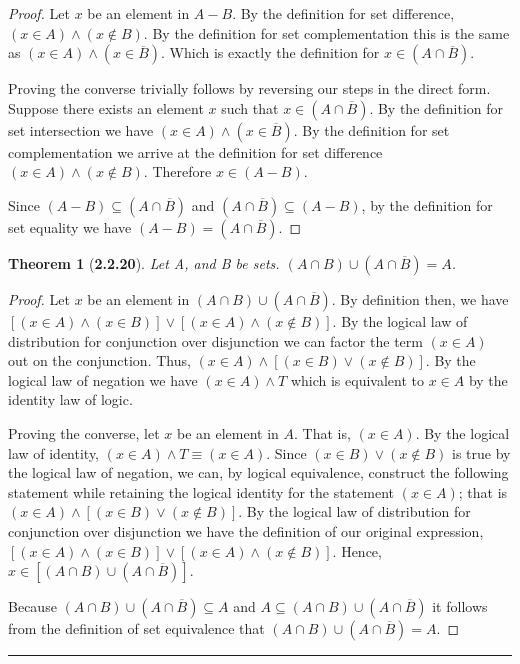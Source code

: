 \documentclass[a4paper, 12pt]{article}
\theoremstyle{plain}
\newtheorem*{theorem*}{Theorem}
\begin{document}
\begin{proof}
    Let $x$ be an element in $A - B$. By the definition for set difference, 
    $(x \in A) \land (x \notin B)$. By the definition for set complementation this is the 
    same as $(x \in A) \land (x \in \overline{B})$. Which is exactly the definition for 
    $x \in (A \cap \overline{B})$.
    
    Proving the converse trivially follows by reversing our steps in the direct form. Suppose 
    there exists an element $x$ such that $x \in (A \cap \overline{B})$. By the definition for 
    set intersection we have $(x \in A) \land (x \in \overline{B})$. By the definition for set 
    complementation we arrive at the definition for set difference \newline 
    $(x \in A) \land (x \notin B)$. Therefore $x \in (A - B)$.
    
    Since $(A - B) \subseteq (A \cap \overline{B})$ and $(A \cap \overline{B}) \subseteq (A - B)$, 
    by the definition for set equality we have $(A - B) = (A \cap \overline{B})$.
\end{proof}

\pagebreak


\begin{theorem*}[\textbf{2.2.20}]
    Let A, and B be sets. $(A \cap B) \cup (A \cap \overline{B}) = A$.
\end{theorem*}

\begin{proof}
    Let $x$ be an element in $(A \cap B) \cup (A \cap \overline{B})$. By definition then, we 
    have $[(x \in A) \land (x \in B)] \lor [(x \in A) \land (x \notin B)]$. By the logical 
    law of distribution for conjunction over disjunction we can factor the term $(x \in A)$ 
    out on the conjunction. Thus, $(x \in A) \land [(x \in B) \lor (x \notin B)]$. By the 
    logical law of negation we have $(x \in A) \land T$ which is equivalent to $x \in A$ by 
    the identity law of logic.
    
    Proving the converse, let $x$ be an element in $A$. That is, $(x \in A)$. By the logical 
    law of identity, $(x \in A) \land T \equiv (x \in A)$. Since $(x \in B) \lor (x \notin B)$ 
    is true by the logical law of negation, we can, by logical equivalence, construct the 
    following statement while retaining the logical identity for the statement $(x \in A)$; that 
    is $(x \in A) \land [(x \in B) \lor (x \notin B)]$. By the logical law of distribution for 
    conjunction over disjunction we have the definition of our original expression, 
    $[(x \in A) \land (x \in B)] \lor [(x \in A) \land (x \notin B)]$. Hence, 
    $x \in [(A \cap B) \cup (A \cap \overline{B})]$.
    
    Because $(A \cap B) \cup (A \cap \overline{B}) \subseteq A$ and 
    $A \subseteq  (A \cap B) \cup (A \cap \overline{B})$ it follows from the definition of set 
    equivalence that $(A \cap B) \cup (A \cap \overline{B}) = A$.
\end{proof}
\begin{center}
    \rule{5.4in}{1pt}
\end{center}
\end{document}
